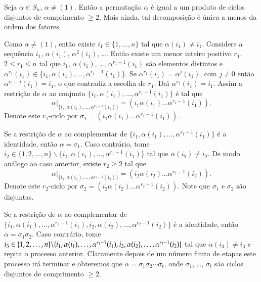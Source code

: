 \begin{proposicao}\label{decomposicao_de_permutacao_em_ciclos_disjuntos}
	Seja $\alpha \in S_n$, $\alpha \ne (1)$. Ent\~ao a permuta\c{c}\~ao $\alpha$ \'e igual a um produto de ciclos disjuntos de comprimento $\ge 2$. Mais ainda, tal decomposi\c{c}\~ao \'e \'unica a menos da ordem dos fatores.
\end{proposicao}
\begin{prova}
	Como $\alpha \ne (1)$, ent\~ao existe $i_1 \in \{1, \dots, n\}$ tal que $\alpha(i_1) \ne i_1$. Considere a sequ\^encia $i_1$, $\alpha(i_1)$, $\alpha^2(i_1)$, \dots. Ent\~ao existe um menor inteiro positivo $r_1$, $2 \le r_1 \le n$ tal que $i_1$, $\alpha(i_1)$, \dots, $\alpha^{r_1 - 1}(i_1)$ s\~ao elementos distintos e $\alpha^{r_1}(i_1) \in \{i_1, \alpha(i_1), \dots, \alpha^{r_1 - 1}(i_1)\}$. Se $\alpha^{r_1}(i_1) = \alpha^j(i_1)$, com $j \ne 0$ ent\~ao $\alpha^{r_1 - j}(i_1) = i_1$, o que contradiz a escolha de $r_1$. Da{\'\i} $\alpha^{r_1}(i_1) = i_1$. Assim a restri\c{c}\~ao de $\alpha$ ao conjunto $\{i_1, \alpha(i_1), \dots, \alpha^{r_1 - 1}(i_1)\}$ \'e tal que
	\[
		\alpha|_{\{i_1, \alpha(i_1), \dots, \alpha^{r_1 - 1}(i_1)\}} = (i_1 \alpha(i_1) \dots \alpha^{r_1 - 1}(i_1)).
	\]
	Denote este $r_1$-ciclo por $\sigma_1 = (i_1 \alpha(i_1) \dots \alpha^{r_1 - 1}(i_1))$.

	Se a restri\c{c}\~ao de $\alpha$ ao complementar de $\{i_1, \alpha(i_1), \dots, \alpha^{r_1 - 1}(i_1)\}$ \'e a identidade, ent\~ao $\alpha = \sigma_1$. Caso contr\'ario, tome $i_2 \in \{1, 2, \dots, n\}\backslash \{i_1, \alpha(i_1), \dots, \alpha^{r_1 - 1}(i_1)\}$ tal que $\alpha(i_2) \ne i_2$. De modo an\'alogo ao caso anterior, existe $r_2 \ge 2$ tal que
	\[
		\alpha|_{\{i_2, \alpha(i_2), \dots, \alpha^{r_2 - 1}(i_2)\}} = (i_2 \alpha(i_2) \dots \alpha^{r_2 - 1}(i_2)).	
	\]
	Denote este $r_2$-ciclo por $\sigma_2 = (i_2 \alpha(i_2) \dots \alpha^{r_2 - 1}(i_2))$. Note que $\sigma_1$ e $\sigma_2$ s\~ao disjuntas.

	Se a restri\c{c}\~ao de $\alpha$ ao complementar de $\{i_1, \alpha(i_1), \dots, \alpha^{r_1 - 1}(i_1), i_2, \alpha(i_2), \dots, \alpha^{r_2 - 1}(i_2)\}$ \'e a identidade, ent\~ao $\alpha = \sigma_1\sigma_2$. Caso contr\'ario, tome $i_3 \in \{1, 2, \dots, n\}\backslash \{i_1, \alpha(i_1), \dots, \alpha^{r_1 - 1}(i_1), i_2,\\ \alpha(i_2), \dots, \alpha^{r_2 - 1}(i_2)\}$ tal que $\alpha(i_3) \ne i_3$ e repita o processo anterior. Claramente depois de um n\'umero finito de etapas este processo ir\'a terminar e obteremos que $\alpha = \sigma_1\sigma_2 \cdots \sigma_t$, onde $\sigma_1$, \dots, $\sigma_t$ s\~ao ciclos disjuntos de comprimento $\ge 2$.


\end{prova}
